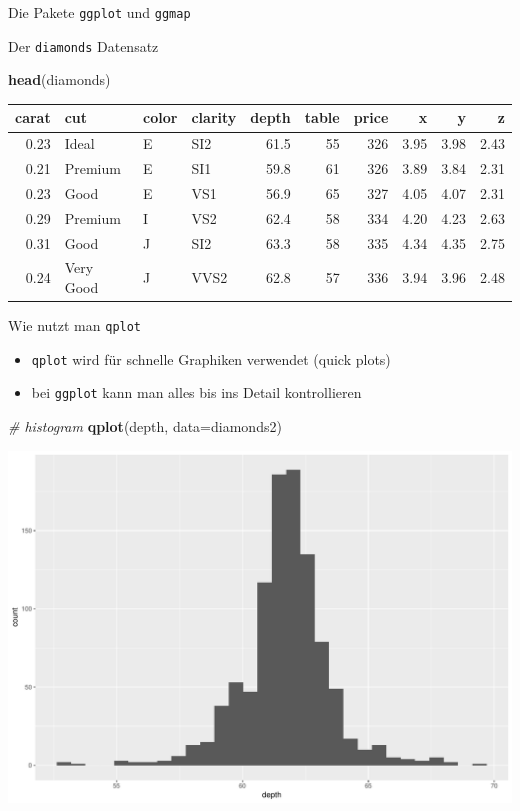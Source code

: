 \documentclass[ignorenonframetext,]{beamer}
\newenvironment{Shaded}{}{}
\newcommand{\KeywordTok}[1]{\textcolor[rgb]{0.00,0.44,0.13}{\textbf{{#1}}}}
\newcommand{\DataTypeTok}[1]{\textcolor[rgb]{0.56,0.13,0.00}{{#1}}}
\newcommand{\CommentTok}[1]{\textcolor[rgb]{0.38,0.63,0.69}{\textit{{#1}}}}
\newcommand{\NormalTok}[1]{{#1}}
\providecommand{\tightlist}{%
\setlength{\itemsep}{0pt}\setlength{\parskip}{0pt}}
\begin{document}
\begin{frame}[fragile]{Die Pakete \texttt{ggplot} und \texttt{ggmap}}
\begin{block}{Der \texttt{diamonds} Datensatz}
\begin{Shaded}
\begin{Highlighting}[]
\KeywordTok{head}\NormalTok{(diamonds)}
\end{Highlighting}
\end{Shaded}

\begin{longtable}[]{@{}rlllrrrrrr@{}}
\toprule
carat & cut & color & clarity & depth & table & price & x & y &
z\tabularnewline
\midrule
\endhead
0.23 & Ideal & E & SI2 & 61.5 & 55 & 326 & 3.95 & 3.98 &
2.43\tabularnewline
0.21 & Premium & E & SI1 & 59.8 & 61 & 326 & 3.89 & 3.84 &
2.31\tabularnewline
0.23 & Good & E & VS1 & 56.9 & 65 & 327 & 4.05 & 4.07 &
2.31\tabularnewline
0.29 & Premium & I & VS2 & 62.4 & 58 & 334 & 4.20 & 4.23 &
2.63\tabularnewline
0.31 & Good & J & SI2 & 63.3 & 58 & 335 & 4.34 & 4.35 &
2.75\tabularnewline
0.24 & Very Good & J & VVS2 & 62.8 & 57 & 336 & 3.94 & 3.96 &
2.48\tabularnewline
\bottomrule
\end{longtable}

\end{block}

\begin{block}{Wie nutzt man \texttt{qplot}}

\begin{itemize}
\tightlist
\item
  \texttt{qplot} wird für schnelle Graphiken verwendet (quick plots)
\item
  bei \texttt{ggplot} kann man alles bis ins Detail kontrollieren
\end{itemize}

\begin{Shaded}
\begin{Highlighting}[]
\CommentTok{# histogram}
\KeywordTok{qplot}\NormalTok{(depth, }\DataTypeTok{data=}\NormalTok{diamonds2)}
\end{Highlighting}
\end{Shaded}

\includegraphics{R_intern_files/figure-beamer/unnamed-chunk-237-1.pdf}


\end{block}
\end{frame}
\end{document}
